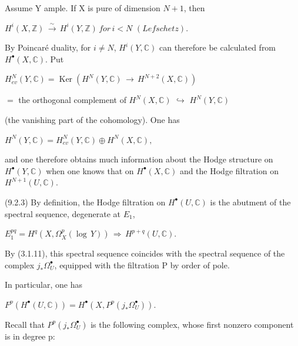 \documentclass[11pt,twoside]{article}
\newcommand{\DFormula}[1]{%
  \par\smallskip\noindent\hspace*{0pt}\(\displaystyle #1\)\par\smallskip
}
\begin{document}
Assume Y ample. If X is pure of dimension \(N+1\), then\par
\par\medskip
\DFormula{H^{i}(X,\mathbb{Z})\,\xrightarrow{\sim }\,H^{i}(Y,\mathbb{Z})\,for\,i<N\,\,(Lefschetz).}
\par\medskip
By Poincaré duality, for \(i\neq N\), \(H^{i}(Y,\mathbb{C})\) can therefore be calculated from \(H^{\bullet }(X,\mathbb{C})\). Put\par
\par\medskip
\DFormula{H_{ev}^{N}(Y,\mathbb{C})=\operatorname{Ker}(H^{N}(Y,\mathbb{C})\,\to \,H^{N+2}(X,\mathbb{C}))}
\par\medskip
\(=\) the orthogonal complement of \(H^{N}(X,\mathbb{C})\) \(\hookrightarrow \) \(H^{N}(Y,\mathbb{C})\)\par
\par\medskip
(the vanishing part of the cohomology). One has\par
\par\medskip
\DFormula{H^{N}(Y,\mathbb{C})=H_{ev}^{N}(Y,\mathbb{C})\oplus H^{N}(X,\mathbb{C}),}
\par\medskip
and one therefore obtains much information about the Hodge structure on \(H^{\bullet }(Y,\mathbb{C})\) when one knows that on \(H^{\bullet }(X,\mathbb{C})\) and the Hodge filtration on \(H^{N+1}(U,\mathbb{C})\).\par
\par\medskip
(9.2.3) By definition, the Hodge filtration on \(H^{\bullet }(U,\mathbb{C})\) is the abutment of the spectral sequence, degenerate at \(E_{1}\),\par
\par\medskip
\DFormula{E_{1}^{pq}=H^{q}(X,\Omega _{X}^{p}(\operatorname{log}\,Y))\,\Rightarrow \,H^{p+q}(U,\mathbb{C}).}
\par\medskip
By (3.1.11), this spectral sequence coincides with the spectral sequence of the complex \(j_{\ast }\Omega _{U}^{\bullet }\), equipped with the filtration P by order of pole.\par
\par\medskip
In particular, one has\par
\par\medskip
\DFormula{F^{p}(H^{\bullet }(U,\mathbb{C}))=H^{\bullet }(X,P^{p}(j_{\ast }\Omega _{U}^{\bullet })).}
\par\medskip
Recall that \(P^{p}(j_{\ast }\Omega _{U}^{\bullet })\) is the following complex, whose first nonzero component is in degree p:\par
\end{document}
